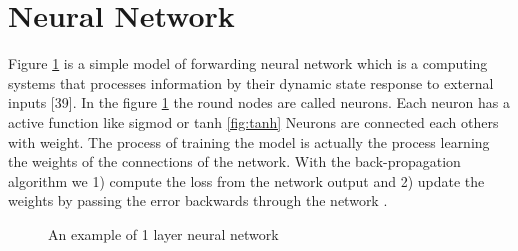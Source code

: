 \section{Neural Network} %
Figure \ref{fig:NN} is a simple model of forwarding neural network which is a computing systems that processes information by their dynamic state response to external inputs [39]. In the figure  \ref{fig:NN}  
the round nodes are called neurons. Each neuron has a active function like sigmod or tanh \ref{fig:tanh} Neurons are connected each others with weight. The process of training the model is actually the process learning the weights of the connections of the network. With the back-propagation algorithm we 1) compute the loss from the network
output and 2) update the weights by passing the error
backwards through the network \cite{rumelhart1988learning}.  
\begin{figure}[!h]
\center
\def\layersep{2.5cm}


   \caption{An example of 1 layer neural network}
\label{fig:NN}
\end{figure}
